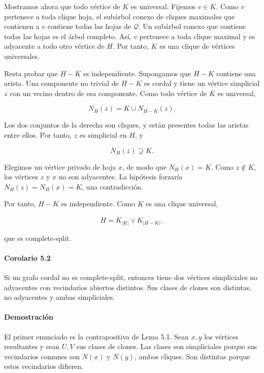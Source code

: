 \documentclass[spanish,11pt,a4paper]{article}
\begin{document}
Mostramos ahora que todo vértice de \(K\) es universal. Fijemos
\(v\in K\). Como \(v\) pertenece a toda clique hoja, el subárbol conexo
de cliques maximales que contienen a \(v\) contiene todas las hojas de
\(\mathcal Q\). Un subárbol conexo que contiene todas las hojas es el
árbol completo. Así, \(v\) pertenece a toda clique maximal y es
adyacente a todo otro vértice de \(H\). Por tanto, \(K\) es una clique
de vértices universales.

Resta probar que \(H-K\) es independiente. Supongamos que \(H-K\)
contiene una arista. Una componente no trivial de \(H-K\) es cordal y
tiene un vértice simplicial \(z\) con un vecino dentro de esa
componente. Como todo vértice de \(K\) es universal,

\[
N_H(z)=K\cup N_{H-K}(z).
\]

Los dos conjuntos de la derecha son cliques, y están presentes todas las
aristas entre ellos. Por tanto, \(z\) es simplicial en \(H\), y

\[
N_H(z)\supsetneq K.
\]

Elegimos un vértice privado de hoja \(x\), de modo que \(N_H(x)=K\).
Como \(z\notin K\), los vértices \(z\) y \(x\) no son adyacentes. La
hipótesis forzaría \(N_H(z)=N_H(x)=K\), una contradicción.

Por tanto, \(H-K\) es independiente. Como \(K\) es una clique universal,

\[
H=K_{|K|}\vee\overline{K_{|H-K|}},
\]

que es complete-split.

\paragraph{Corolario 5.2}\label{corolario-5.2}

Si un grafo cordal no es complete-split, entonces tiene dos vértices
simpliciales no adyacentes con vecindarios abiertos distintos. Sus
clases de clones son distintas, no adyacentes y ambas simpliciales.

\paragraph{Demostración}\label{demostraciuxf3n-6}

El primer enunciado es la contrapositiva de Lema 5.1. Sean \(x,y\) los
vértices resultantes y sean \(U,V\) sus clases de clones. Las clases son
simpliciales porque sus vecindarios comunes son \(N(x)\) y \(N(y)\),
ambos cliques. Son distintas porque estos vecindarios difieren.
\end{document}
